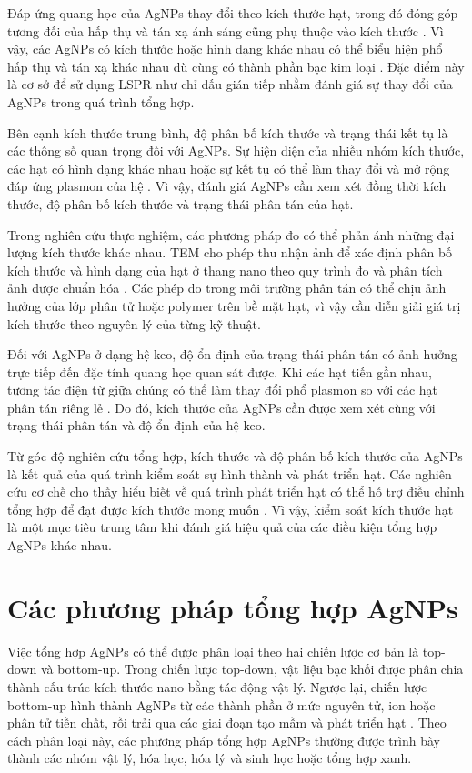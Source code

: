 Đáp ứng quang học của AgNPs thay đổi theo kích thước hạt, trong đó đóng góp tương đối của hấp thụ và tán xạ ánh sáng cũng phụ thuộc vào kích thước \parencite{kelly2003}.
Vì vậy, các AgNPs có kích thước hoặc hình dạng khác nhau có thể biểu hiện phổ hấp thụ và tán xạ khác nhau dù cùng có thành phần bạc kim loại \parencite{kelly2003,mota2020}.
Đặc điểm này là cơ sở để sử dụng LSPR như chỉ dấu gián tiếp nhằm đánh giá sự thay đổi của AgNPs trong quá trình tổng hợp.
\par
Bên cạnh kích thước trung bình, độ phân bố kích thước và trạng thái kết tụ là các thông số quan trọng đối với AgNPs.
Sự hiện diện của nhiều nhóm kích thước, các hạt có hình dạng khác nhau hoặc sự kết tụ có thể làm thay đổi và mở rộng đáp ứng plasmon của hệ \parencite{kelly2003,mulvaney1996}.
Vì vậy, đánh giá AgNPs cần xem xét đồng thời kích thước, độ phân bố kích thước và trạng thái phân tán của hạt.
\par
Trong nghiên cứu thực nghiệm, các phương pháp đo có thể phản ánh những đại lượng kích thước khác nhau.
TEM cho phép thu nhận ảnh để xác định phân bố kích thước và hình dạng của hạt ở thang nano theo quy trình đo và phân tích ảnh được chuẩn hóa \parencite{iso21363}.
Các phép đo trong môi trường phân tán có thể chịu ảnh hưởng của lớp phân tử hoặc polymer trên bề mặt hạt, vì vậy cần diễn giải giá trị kích thước theo nguyên lý của từng kỹ thuật.
\par
Đối với AgNPs ở dạng hệ keo, độ ổn định của trạng thái phân tán có ảnh hưởng trực tiếp đến đặc tính quang học quan sát được.
Khi các hạt tiến gần nhau, tương tác điện từ giữa chúng có thể làm thay đổi phổ plasmon so với các hạt phân tán riêng lẻ \parencite{kelly2003,mulvaney1996}.
Do đó, kích thước của AgNPs cần được xem xét cùng với trạng thái phân tán và độ ổn định của hệ keo.
\par
Từ góc độ nghiên cứu tổng hợp, kích thước và độ phân bố kích thước của AgNPs là kết quả của quá trình kiểm soát sự hình thành và phát triển hạt.
Các nghiên cứu cơ chế cho thấy hiểu biết về quá trình phát triển hạt có thể hỗ trợ điều chỉnh tổng hợp để đạt được kích thước mong muốn \parencite{wuithschick2013}.
Vì vậy, kiểm soát kích thước hạt là một mục tiêu trung tâm khi đánh giá hiệu quả của các điều kiện tổng hợp AgNPs khác nhau.

\section{Các phương pháp tổng hợp AgNPs}
Việc tổng hợp AgNPs có thể được phân loại theo hai chiến lược cơ bản là top-down và bottom-up.
Trong chiến lược top-down, vật liệu bạc khối được phân chia thành cấu trúc kích thước nano bằng tác động vật lý.
Ngược lại, chiến lược bottom-up hình thành AgNPs từ các thành phần ở mức nguyên tử, ion hoặc phân tử tiền chất, rồi trải qua các giai đoạn tạo mầm và phát triển hạt \parencite{iravani2014,nguyen2023,lee2019}.
Theo cách phân loại này, các phương pháp tổng hợp AgNPs thường được trình bày thành các nhóm vật lý, hóa học, hóa lý và sinh học hoặc tổng hợp xanh.
\par
